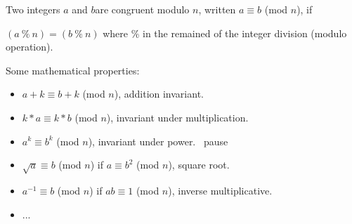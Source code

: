 \documentclass[handout, xcolor=dvipsnames,aspectratio=169]{beamer}
\begin{document}
\begin{frame}{}

  Two integers $a$ and $b$are congruent modulo $n$, written $a \equiv b$ (mod $n$), if

  $(a\ \%\ n) = (b\ \%\ n)$ where \% in the remained of the integer division (modulo operation).

  \medskip

  \pause

  Some mathematical properties:

  \pause

  \begin{itemize}
     \item $a + k \equiv b + k $ (mod $ n $), addition invariant.
     \item $k * a \equiv k * b $ (mod $ n $), invariant under multiplication.
     \item $a ^ k \equiv b ^ k $ (mod $ n $), invariant under power. \ pause
     \item $\sqrt {a} \equiv b $ (mod $ n $) if $ a \equiv b ^ 2 $ (mod $ n $), square root.
     \item $a ^ {- 1} \equiv b $ (mod $ n $) if $ ab \equiv 1 $ (mod $ n $), inverse multiplicative.
     \item ...
  \end{itemize}

\end{frame}
\end{document}
